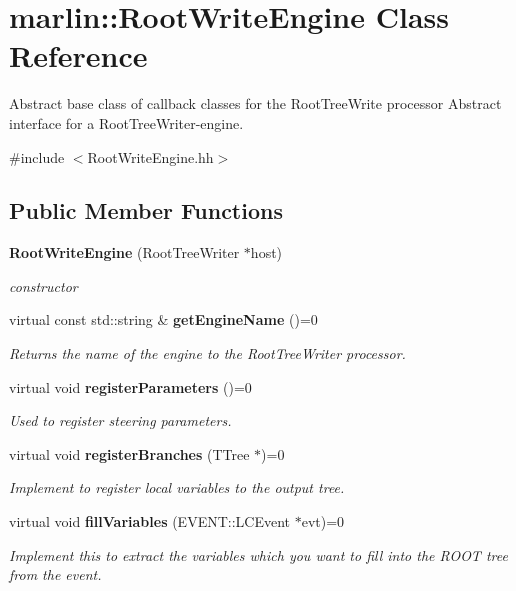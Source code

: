 \section{marlin::RootWriteEngine Class Reference}
\label{classmarlin_1_1RootWriteEngine}


Abstract base class of callback classes for the RootTreeWrite processor Abstract interface for a RootTreeWriter-\/engine.  


{\ttfamily \#include $<$RootWriteEngine.hh$>$}\subsection*{Public Member Functions}
\begin{DoxyCompactItemize}
\item 
{\bf RootWriteEngine} (RootTreeWriter $\ast$host)
\begin{DoxyCompactList}\small\item\em constructor \item\end{DoxyCompactList}\item 
virtual const std::string \& {\bf getEngineName} ()=0
\begin{DoxyCompactList}\small\item\em Returns the name of the engine to the RootTreeWriter processor. \item\end{DoxyCompactList}\item 
virtual void {\bf registerParameters} ()=0
\begin{DoxyCompactList}\small\item\em Used to register steering parameters. \item\end{DoxyCompactList}\item 
virtual void {\bf registerBranches} (TTree $\ast$)=0
\begin{DoxyCompactList}\small\item\em Implement to register local variables to the output tree. \item\end{DoxyCompactList}\item 
virtual void {\bf fillVariables} (EVENT::LCEvent $\ast$evt)=0
\begin{DoxyCompactList}\small\item\em Implement this to extract the variables which you want to fill into the {\itshape ROOT\/} tree from the event. \item\end{DoxyCompactList}\end{DoxyCompactItemize}

